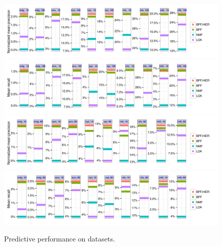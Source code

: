 \begin{figure}[th]
\centering
\includegraphics[width=\textwidth]{./figures/meanprecision2.pdf}\\               
\includegraphics[width=\textwidth]{./figures/meanrecall2.pdf}\\               
\includegraphics[width=\textwidth]{./figures/useractivity-meanprecision2.pdf}\\
\includegraphics[width=\textwidth]{./figures/useractivity-meanrecall2.pdf}\\
\caption{Predictive performance on datasets.}
\label{fig:precision_by_M}
\end{figure}

